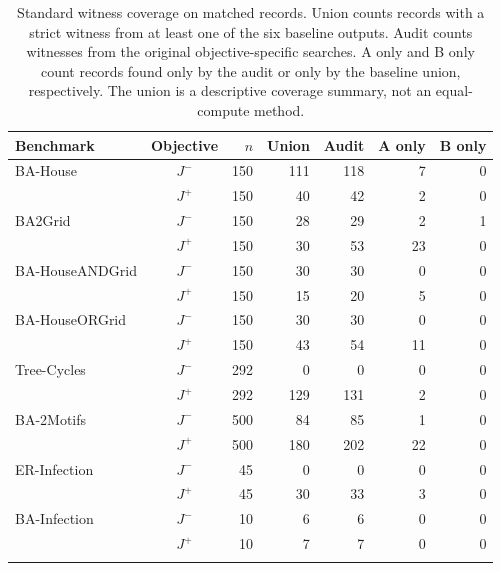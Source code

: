 \begin{table}[htbp]
\caption{Standard witness coverage on matched records.
Union counts records with a strict witness from at least one of the six baseline outputs.
Audit counts witnesses from the original objective-specific searches.
A only and B only count records found only by the audit or only by the baseline union, respectively.
The union is a descriptive coverage summary, not an equal-compute method.}
\label{tab:baseline-audit-coverage}
\centering
\scriptsize
\setlength{\tabcolsep}{5pt}
\begin{tabular}{@{}lcr rrrr@{}}
\toprule
Benchmark & Objective & $n$ & Union & Audit & A only & B only\\
\midrule
BA-House & $J^-$ & 150 & 111 & 118 & 7 & 0 \\
 & $J^+$ & 150 & 40 & 42 & 2 & 0 \\
\addlinespace
BA2Grid & $J^-$ & 150 & 28 & 29 & 2 & 1 \\
 & $J^+$ & 150 & 30 & 53 & 23 & 0 \\
\addlinespace
BA-HouseANDGrid & $J^-$ & 150 & 30 & 30 & 0 & 0 \\
 & $J^+$ & 150 & 15 & 20 & 5 & 0 \\
\addlinespace
BA-HouseORGrid & $J^-$ & 150 & 30 & 30 & 0 & 0 \\
 & $J^+$ & 150 & 43 & 54 & 11 & 0 \\
\addlinespace
Tree-Cycles & $J^-$ & 292 & 0 & 0 & 0 & 0 \\
 & $J^+$ & 292 & 129 & 131 & 2 & 0 \\
\addlinespace
BA-2Motifs & $J^-$ & 500 & 84 & 85 & 1 & 0 \\
 & $J^+$ & 500 & 180 & 202 & 22 & 0 \\
\addlinespace
ER-Infection & $J^-$ & 45 & 0 & 0 & 0 & 0 \\
 & $J^+$ & 45 & 30 & 33 & 3 & 0 \\
\addlinespace
BA-Infection & $J^-$ & 10 & 6 & 6 & 0 & 0 \\
 & $J^+$ & 10 & 7 & 7 & 0 & 0 \\
\addlinespace
\bottomrule
\end{tabular}
\end{table}
